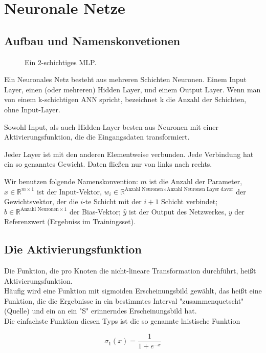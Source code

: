 \section{Neuronale Netze} %

\subsection{Aufbau und Namenskonvetionen}
\begin{figure}[ht!]
  \centering
    
  \caption{Ein 2-schichtiges MLP.}
\end{figure}


Ein Neuronales Netz besteht aus mehreren Schichten Neuronen. Einem Input Layer, einen (oder mehreren) Hidden Layer, und einem Output Layer. 
Wenn man von einem k-schichtigen ANN spricht, bezeichnet k die Anzahl der Schichten, ohne Input-Layer.

Sowohl Input, als auch Hidden-Layer besten aus Neuronen mit einer Aktivierungsfunktion, die die Eingangsdaten transformiert.

Jeder Layer ist mit den anderen Elementweise verbunden. Jede Verbindung hat ein so genanntes Gewicht. Daten fließen nur von links nach rechts. 

Wir benutzen folgende Namenskonvention: $m$ ist die Anzahl der Parameter, $x \in \mathbb{R}^{m \times 1}$ ist der Input-Vektor, 
$w_i\in \mathbb{R}^{\text{Anzahl Neuronen} \times \text{Anzahl Neuronen Layer davor}}$ der Gewichtsvektor, der die $i$-te Schicht mit der $i+1$ Schicht verbindet; $b \in \mathbb{R}^{\text{Anzahl Neuronen} \times 1}$ der Bias-Vektor; $\hat{y}$ ist der Output des Netzwerkes, $y$ der Referenzwert (Ergebniss im Trainingsset).  

\subsection{Die Aktivierungsfunktion}
Die Funktion, die pro Knoten die nicht-lineare Transformation durchführt, heißt Aktivierungsfunktion. \\
Häufig wird eine Funktion mit sigmoiden Erscheinungsbild gewählt, das heißt eine Funktion, die die Ergebnisse in ein bestimmtes Interval "zusammenquetscht" (Quelle) und ein an ein "S" erinnerndes Erscheinungsbild hat. 
\\
Die einfachste Funktion diesen Typs ist die so genannte lnistische Funktion

\begin{equation}
\sigma_1(x) = \frac{1}{1+e^{-x}}
\end{equation}

